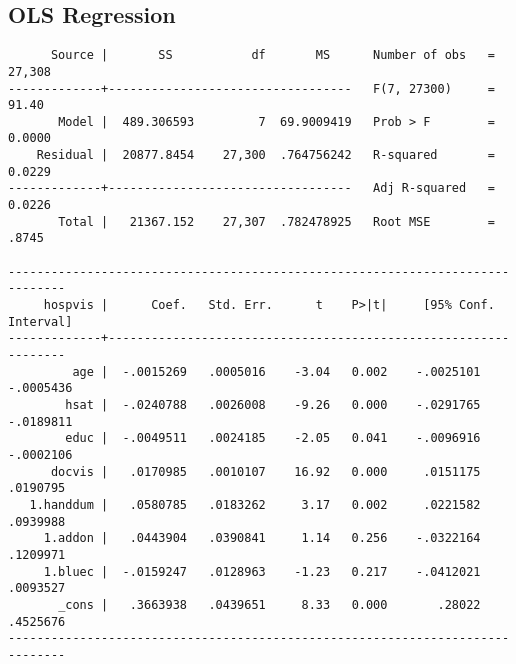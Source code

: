 \documentclass{article}
\begin{document}
\newpage
\hypertarget{ols}{\subsection*{OLS Regression}}
\begin{verbatim}
      Source |       SS           df       MS      Number of obs   =    27,308
-------------+----------------------------------   F(7, 27300)     =     91.40
       Model |  489.306593         7  69.9009419   Prob > F        =    0.0000
    Residual |  20877.8454    27,300  .764756242   R-squared       =    0.0229
-------------+----------------------------------   Adj R-squared   =    0.0226
       Total |   21367.152    27,307  .782478925   Root MSE        =     .8745

------------------------------------------------------------------------------
     hospvis |      Coef.   Std. Err.      t    P>|t|     [95% Conf. Interval]
-------------+----------------------------------------------------------------
         age |  -.0015269   .0005016    -3.04   0.002    -.0025101   -.0005436
        hsat |  -.0240788   .0026008    -9.26   0.000    -.0291765   -.0189811
        educ |  -.0049511   .0024185    -2.05   0.041    -.0096916   -.0002106
      docvis |   .0170985   .0010107    16.92   0.000     .0151175    .0190795
   1.handdum |   .0580785   .0183262     3.17   0.002     .0221582    .0939988
     1.addon |   .0443904   .0390841     1.14   0.256    -.0322164    .1209971
     1.bluec |  -.0159247   .0128963    -1.23   0.217    -.0412021    .0093527
       _cons |   .3663938   .0439651     8.33   0.000       .28022    .4525676
------------------------------------------------------------------------------
\end{verbatim}



\end{document}
